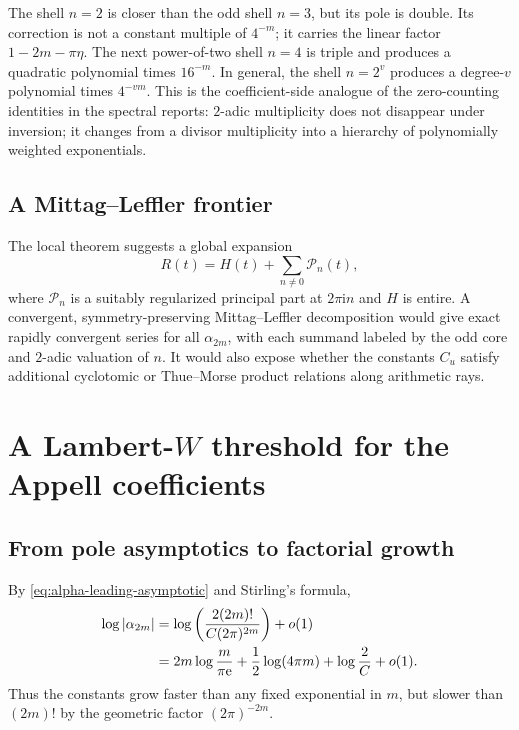 \documentclass[11pt,oneside]{article}
\theoremstyle{frontier}
\theoremstyle{definition}
\theoremstyle{remark}
\newcommand{\e}{\mathrm e}
\newcommand{\ii}{\mathrm i}
\newcommand{\littleo}{o}
\begin{document}
The shell $n=2$ is closer than the odd shell $n=3$, but its pole is double.  Its correction is not a
constant multiple of $4^{-m}$; it carries the linear factor $1-2m-\pi\eta$.  The next power-of-two
shell $n=4$ is triple and produces a quadratic polynomial times $16^{-m}$.  In general, the shell
$n=2^v$ produces a degree-$v$ polynomial times $4^{-vm}$.  This is the coefficient-side analogue
of the zero-counting identities in the spectral reports: $2$-adic multiplicity does not disappear
under inversion; it changes from a divisor multiplicity into a hierarchy of polynomially weighted
exponentials.

\subsection{A Mittag--Leffler frontier}

The local theorem suggests a global expansion
\begin{equation}
 R(t)=H(t)+\sum_{n\ne0}\mathcal P_n(t),
 \label{eq:mittag-leffler-formal}
\end{equation}
where $\mathcal P_n$ is a suitably regularized principal part at $2\pi\ii n$ and $H$ is entire.
A convergent, symmetry-preserving Mittag--Leffler decomposition would give exact rapidly convergent
series for all $\alpha_{2m}$, with each summand labeled by the odd core and $2$-adic valuation of
$n$.  It would also expose whether the constants $C_u$ satisfy additional cyclotomic or
Thue--Morse product relations along arithmetic rays.

\section{A Lambert-\texorpdfstring{$W$}{W} threshold for the Appell coefficients}
\label{sec:lambert}

\subsection{From pole asymptotics to factorial growth}

By \eqref{eq:alpha-leading-asymptotic} and Stirling's formula,
\begin{align}
 \log|\alpha_{2m}|
 &=\log\left(\frac{2(2m)!}{C(2\pi)^{2m}}\right)+\littleo(1)
 \notag\\
 &=2m\log\frac{m}{\pi\e}
 +\frac12\log(4\pi m)+\log\frac2C+\littleo(1).
 \label{eq:log-alpha-Stirling}
\end{align}
Thus the constants grow faster than any fixed exponential in $m$, but slower than $(2m)!$ by the
geometric factor $(2\pi)^{-2m}$.
\end{document}
